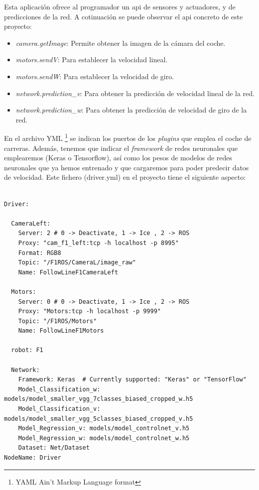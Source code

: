 Esta aplicación ofrece al programador un \acrfull{api} de sensores y actuadores, y de predicciones de la red. A cotinuación se puede observar el \acrshort{api} concreto de este proyecto:

\begin{itemize}
    \item \textit{camera.getImage}: Permite obtener la imagen de la cámara del coche.
    
    \item \textit{motors.sendV}: Para establecer la velocidad lineal.
    
    \item \textit{motors.sendW}: Para establecer la velocidad de giro.
    
    \item \textit{network.prediction\_v}: Para obtener la predicción de velocidad lineal de la red.
    
    \item \textit{network.prediction\_w}: Para obtener la predicción de velocidad de giro de la red.
\end{itemize}


En el archivo YML \footnote{YAML Ain't Markup Language format} se indican los puertos de los \textit{plugins} que emplea el coche de carreras. Además, tenemos que indicar el \textit{framework} de redes neuronales que emplearemos (Keras o Tensorflow), así como los pesos de modelos de redes neuronales que ya hemos entrenado y que cargaremos para poder predecir datos de velocidad. Este fichero (driver.yml) en el proyecto tiene el siguiente aspecto:\\


\vspace{10pt}
\begin{lstlisting}[basicstyle=\small]

Driver:

  CameraLeft:
    Server: 2 # 0 -> Deactivate, 1 -> Ice , 2 -> ROS
    Proxy: "cam_f1_left:tcp -h localhost -p 8995"
    Format: RGB8
    Topic: "/F1ROS/CameraL/image_raw"
    Name: FollowLineF1CameraLeft

  Motors:
    Server: 0 # 0 -> Deactivate, 1 -> Ice , 2 -> ROS
    Proxy: "Motors:tcp -h localhost -p 9999"
    Topic: "/F1ROS/Motors"
    Name: FollowLineF1Motors

  robot: F1

  Network:
    Framework: Keras  # Currently supported: "Keras" or "TensorFlow"
    Model_Classification_w: models/model_smaller_vgg_7classes_biased_cropped_w.h5
    Model_Classification_v: models/model_smaller_vgg_5classes_biased_cropped_v.h5
    Model_Regression_v: models/model_controlnet_v.h5
    Model_Regression_w: models/model_controlnet_w.h5
    Dataset: Net/Dataset
NodeName: Driver
\end{lstlisting}
\vspace{20pt}

